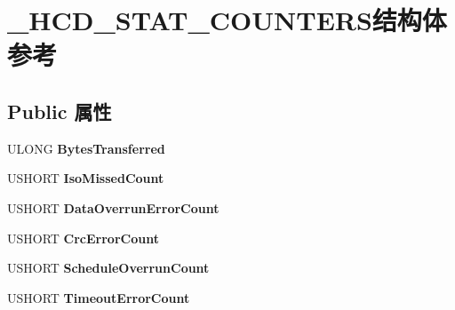\hypertarget{struct___h_c_d___s_t_a_t___c_o_u_n_t_e_r_s}{}\section{\+\_\+\+H\+C\+D\+\_\+\+S\+T\+A\+T\+\_\+\+C\+O\+U\+N\+T\+E\+R\+S结构体 参考}
\label{struct___h_c_d___s_t_a_t___c_o_u_n_t_e_r_s}
\subsection*{Public 属性}
\begin{DoxyCompactItemize}
\item 
\mbox{\label{struct___h_c_d___s_t_a_t___c_o_u_n_t_e_r_s_a54a2109ab72157daa8b896ef9c691cd2}} 
U\+L\+O\+NG {\bfseries Bytes\+Transferred}
\item 
\mbox{\label{struct___h_c_d___s_t_a_t___c_o_u_n_t_e_r_s_aa31585d391adf8fc6a0b178386bba32a}} 
U\+S\+H\+O\+RT {\bfseries Iso\+Missed\+Count}
\item 
\mbox{\label{struct___h_c_d___s_t_a_t___c_o_u_n_t_e_r_s_a3d5be526bbc08ce7744a37eb2b05cb23}} 
U\+S\+H\+O\+RT {\bfseries Data\+Overrun\+Error\+Count}
\item 
\mbox{\label{struct___h_c_d___s_t_a_t___c_o_u_n_t_e_r_s_aaeca784b1e35d60bf1885eeb4a10c027}} 
U\+S\+H\+O\+RT {\bfseries Crc\+Error\+Count}
\item 
\mbox{\label{struct___h_c_d___s_t_a_t___c_o_u_n_t_e_r_s_ab47140b5f501fbe4495f5042c182c707}} 
U\+S\+H\+O\+RT {\bfseries Schedule\+Overrun\+Count}
\item 
\mbox{\label{struct___h_c_d___s_t_a_t___c_o_u_n_t_e_r_s_a8e8c7a8827d764abca0ab0a40efb1c20}} 
U\+S\+H\+O\+RT {\bfseries Timeout\+Error\+Count}
\item 
\mbox{\label{struct___h_c_d___s_t_a_t___c_o_u_n_t_e_r_s_a104de8e236193872867d78c3a8e276c3}} 

\end{DoxyCompactItemize}

